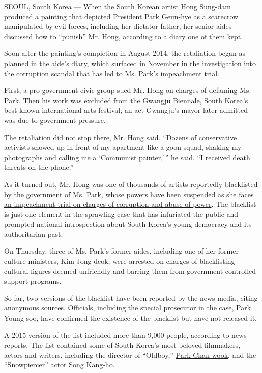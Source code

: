 SEOUL, South Korea --- When the South Korean artist Hong Sung-dam
produced a painting that depicted President
\href{https://www.nytimes3xbfgragh.onion/topic/person/park-geunhye}{Park
Geun-hye} as a scarecrow manipulated by evil forces, including her
dictator father, her senior aides discussed how to ``punish'' Mr. Hong,
according to a diary one of them kept.

Soon after the painting's completion in August 2014, the retaliation
began as planned in the aide's diary, which surfaced in November in the
investigation into the corruption scandal that has led to Ms. Park's
impeachment trial.

First, a pro-government civic group sued Mr. Hong on
\href{https://www.nytimes3xbfgragh.onion/2014/08/31/world/asia/an-artist-is-rebuked-for-casting-south-koreas-leader-in-an-unflattering-light.html}{charges
of defaming Ms. Park}. Then his work was excluded from the Gwangju
Biennale, South Korea's best-known international arts festival, an act
Gwangju's mayor later admitted was due to government pressure.

The retaliation did not stop there, Mr. Hong said. ``Dozens of
conservative activists showed up in front of my apartment like a goon
squad, shaking my photographs and calling me a `Communist painter,''' he
said. ``I received death threats on the phone.''

As it turned out, Mr. Hong was one of thousands of artists reportedly
blacklisted by the government of Ms. Park, whose powers have been
suspended as she faces
\href{https://www.nytimes3xbfgragh.onion/2016/12/22/world/asia/south-korea-president-park-impeachment.html}{an
impeachment trial on charges of corruption and abuse of power}. The
blacklist is just one element in the sprawling case that has infuriated
the public and prompted national introspection about South Korea's young
democracy and its authoritarian past.

On Thursday, three of Ms. Park's former aides, including one of her
former culture ministers, Kim Jong-deok, were arrested on charges of
blacklisting cultural figures deemed unfriendly and barring them from
government-controlled support programs.

So far, two versions of the blacklist have been reported by the news
media, citing anonymous sources. Officials, including the special
prosecutor in the case, Park Young-soo, have confirmed the existence of
the blacklist but have not released it.

A 2015 version of the list included more than 9,000 people, according to
news reports. The list contained some of South Korea's most beloved
filmmakers, actors and writers, including the director of ``Oldboy,''
\href{http://www.imdb.com/title/tt0364569/}{Park Chan-wook}, and the
``Snowpiercer'' actor
\href{http://www.imdb.com/title/tt1706620/?ref_=nv_sr_1}{Song Kang-ho}.

